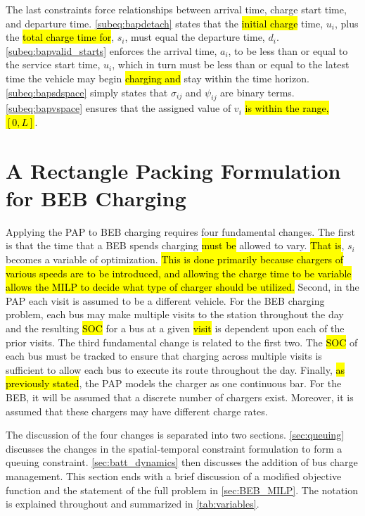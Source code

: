 \documentclass[utf8]{FrontiersinHarvard}
\begin{document}
The last constraints force relationships between arrival time, charge start time, and departure time.
\autoref{subeq:bapdetach} states that the \hl{ initial charge} time, \(u_i\), plus the \hl{total charge time for}, \(s_i\), must equal the departure time, \(d_i\). \autoref{subeq:bapvalid_starts} enforces the arrival
time, \(a_i\), to be less than or equal to the service start time, \(u_i\), which in turn must be less than or equal to the
latest time the vehicle may begin \hl{charging and} stay within the time horizon. \autoref{subeq:bapsdspace}
simply states that \(\sigma_{ij}\) and \(\psi_{ij}\) are binary terms. \autoref{subeq:bapvspace} ensures that the assigned value of
\(v_i\) \hl{is within the range, $[0,L]$}.
\section{A Rectangle Packing Formulation for BEB Charging}
\label{sec:problemformulation}
Applying the PAP to BEB charging requires four fundamental changes. The first is that the time that a BEB spends
charging \hl{must be} allowed to vary. \hl{That is}, \(s_i\) becomes a variable of optimization.
\hl{This is done primarily because chargers of various speeds are to be introduced, and allowing the charge time to be variable allows the MILP to decide what type of charger should be utilized.} Second, in the PAP each visit
is assumed to be a different vehicle. For the BEB charging problem, each bus may make multiple visits to the station
throughout the day and the resulting \hl{SOC} for a bus at a given \hl{visit} is dependent upon
each of the prior visits. The third fundamental change is related to the first two. The \hl{SOC} of each bus
must be tracked to ensure that charging across multiple visits is sufficient to allow each bus to execute its route
throughout the day. Finally, \hl{as previously stated}, the PAP models the charger as one continuous bar. For
the BEB, it will be assumed that a discrete number of chargers exist. Moreover, it is assumed that these chargers may
have different charge rates.

The discussion of the four changes is separated into two sections. \autoref{sec:queuing} discusses the changes in the
spatial-temporal constraint formulation to form a queuing constraint. \autoref{sec:batt_dynamics} then discusses the
addition of bus charge management. This section ends with a brief discussion of a modified objective function and the
statement of the full problem in \autoref{sec:BEB_MILP}. The notation is explained throughout and summarized in
\autoref{tab:variables}.
\end{document}
